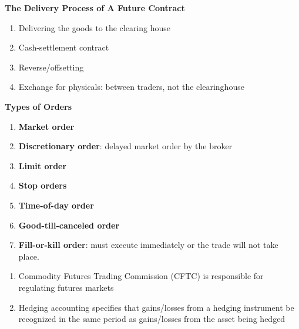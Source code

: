 \documentclass[11pt,fleqn]{book} %
\numberwithin{equation}{section} %
\numberwithin{figure}{section} %
\numberwithin{table}{section} %
\begin{document}
\begin{definition}
\textbf{The Delivery Process of A Future Contract}
\begin{enumerate}
    \item Delivering the goods to the clearing house
    \item Cash-settlement contract
    \item Reverse/offsetting
    \item Exchange for physicals: between traders, not the clearinghouse
\end{enumerate}
\end{definition}
\begin{definition}\textbf{Types of Orders}
\begin{enumerate}
    \item \textbf{Market order}
    \item \textbf{Discretionary order}: delayed market order by the broker
    \item \textbf{Limit order}
    \item \textbf{Stop orders}
    \item \textbf{Time-of-day order}
    \item \textbf{Good-till-canceled order}
    \item \textbf{Fill-or-kill order}: must execute immediately or the trade will not take place.
\end{enumerate}
\end{definition}
\begin{remark}
\begin{enumerate}
    \item Commodity Futures Trading Commission (CFTC) is responsible for regulating futures markets
    \item Hedging accounting specifies that gains/losses from a hedging instrument be recognized in the same period as gains/losses from the asset being hedged
\end{enumerate}
\end{remark}
\end{document}
